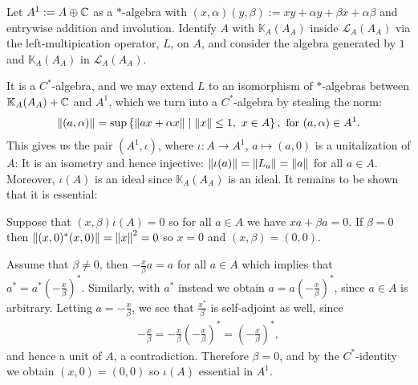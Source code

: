 \begin{example}
	Let $A^1 := A \oplus \mathbb{C}$ as a $*$-algebra with $(x,\alpha)(y,\beta):=xy+\alpha y + \beta x + \alpha \beta$ and entrywise addition and involution. Identify $A$ with $\mathbb{K}_A(A_A)$ inside $\mathcal{L}_A(A_A)$ via the left-multipication operator, $L$, on $A$, and consider the algebra generated by $1$ and $\mathbb{K}_A(A_A)$ in $\mathcal{L}_A(A_A)$. 
	
	It is a $C^*$-algebra, and we may extend $L$ to an isomorphism of $*$-algebras between $\mathbb{K}_A(A_A)+\mathbb{C}$ and $A^1$, which we turn into a $C^*$-algebra by stealing the norm:
	\begin{align*}
		\left\lVert (a,\alpha)\right\rVert = \sup\left\{ \left\lVert ax + \alpha x \right\rVert \mid \left\lVert x \right\rVert \leq 1, \ x \in A \right\}, \text{ for } (a,\alpha) \in A^1.
	\end{align*}
	This gives us the pair $(A^1,\iota)$, where $\iota \colon A \to A^1$, $a \mapsto (a,0)$ is a unitalization of $A$: It is an isometry and hence injective: $\left\lVert \iota(a)\right\rVert = \left\lVert L_a \right\rVert = \left\lVert a \right\rVert$ for all $a \in A$. Moreover, $\iota(A)$ is an ideal since $\mathbb{K}_{A}(A_A)$ is an ideal. It remains to be shown that it is essential:

	Suppose that $(x,\beta) \iota(A)=0$ so for all $a \in A$ we have $xa+\beta a = 0$. If $\beta = 0$ then $\left\lVert(x,0)^*(x,0)\right\rVert = \left\lVert x\right\rVert^2 = 0$ so $x = 0$ and $(x,\beta)=(0,0)$.
	
	Assume that $\beta \neq 0$, then $-\frac{x}{\beta}a = a$ for all $ a \in A$ which implies that $a^* = a^* \left( - \frac{x}{\beta}\right)^*$. Similarly, with $a^*$ instead we obtain $a = a\left(-\frac{x}{\beta}\right)^*$, since $a \in A$ is arbitrary. Letting $a = -\frac{x}{\beta}$, we see that $\frac{x^*}{\beta}$ is self-adjoint as well, since
	\begin{align*}
		-\frac{x}{\beta} = -\frac{x}{\beta} \left(-\frac{x}{\beta}\right)^* = \left(-\frac{x}{\beta}\right)^*,
	\end{align*}
	and hence a unit of $A$, a contradiction. Therefore $\beta = 0$, and by the $C^*$-identity we obtain $(x,0) = (0,0)$ so $\iota(A)$ essential in $A^1$.
\end{example}

